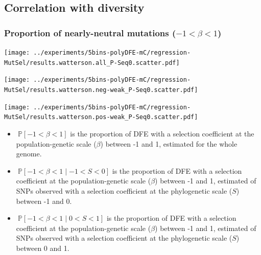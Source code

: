 \documentclass{article}
\newcommand{\proba}{\mathbb{P}}
\newcommand{\Sphy}{S}
\newcommand{\divWeakDel}{-1 < \Sphy < 0}
\newcommand{\divWeakAdv}{0 < \Sphy < 1}
\newcommand{\given}{\mid}
\newcommand{\Spop}{\beta}
\newcommand{\polyNeutral}{-1 < \Spop < 1}
\begin{document}
    \newpage

    \subsection{Correlation with diversity}

    \subsubsection{Proportion of nearly-neutral mutations ($\polyNeutral$)}\label{subsec:proportion-nearly-neutral-mutations}
    \begin{minipage}{0.32\linewidth}
        \texttt{[image: ../experiments/5bins-polyDFE-mC/regression-MutSel/results.watterson.all\_P-Seq0.scatter.pdf]}
    \end{minipage}
    \begin{minipage}{0.32\linewidth}
        \texttt{[image: ../experiments/5bins-polyDFE-mC/regression-MutSel/results.watterson.neg-weak\_P-Seq0.scatter.pdf]}
    \end{minipage}
    \begin{minipage}{0.32\linewidth}
        \texttt{[image: ../experiments/5bins-polyDFE-mC/regression-MutSel/results.watterson.pos-weak\_P-Seq0.scatter.pdf]}
    \end{minipage}
    \begin{itemize}
        \item $\ \proba [ \polyNeutral ]$ is the proportion of DFE with a selection coefficient at the population-genetic scale ($\Spop$) between -1 and 1, estimated for the whole genome.
        \item $\ \proba [ \polyNeutral \given \divWeakDel]$ is the proportion of DFE with a selection coefficient at the population-genetic scale ($\Spop$) between -1 and 1, estimated of SNPs observed with a selection coefficient at the phylogenetic scale ($\Sphy$) between -1 and 0.
        \item $\ \proba [ \polyNeutral \given \divWeakAdv ]$ is the proportion of DFE with a selection coefficient at the population-genetic scale ($\Spop$) between -1 and 1, estimated of SNPs observed with a selection coefficient at the phylogenetic scale ($\Sphy$) between 0 and 1.
    \end{itemize}
\end{document}
